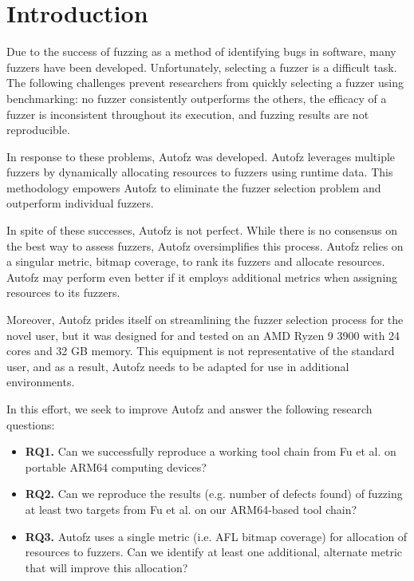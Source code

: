 \section{Introduction}

Due to the success of fuzzing as a method of identifying bugs in software, many fuzzers have been 
developed. Unfortunately, selecting a fuzzer is a difficult task. The following challenges prevent 
researchers from quickly selecting a fuzzer using benchmarking: no fuzzer consistently outperforms 
the others, the efficacy of a fuzzer is inconsistent throughout its execution, and fuzzing results 
are not reproducible.

In response to these problems, Autofz was developed. Autofz leverages multiple fuzzers by dynamically 
allocating resources to fuzzers using runtime data. This methodology empowers Autofz to eliminate the 
fuzzer selection problem and outperform individual fuzzers.

In spite of these successes, Autofz is not perfect. While there is no consensus on the best way to 
assess fuzzers, Autofz oversimplifies this process. Autofz relies on a singular metric, bitmap 
coverage, to rank its fuzzers and allocate resources. Autofz may perform even better if it employs 
additional metrics when assigning resources to its fuzzers.

Moreover, Autofz prides itself on streamlining the fuzzer selection process for the novel user, but 
it was designed for and tested on an AMD Ryzen 9 3900 with 24 cores and 32 GB memory. This equipment 
is not representative of the standard user, and as a result, Autofz needs to be adapted for use in 
additional environments. \cite{Fu}

In this effort, we seek to improve Autofz and answer the following research questions:
\begin{itemize}
    \item \textbf{RQ1.} Can we successfully reproduce a working tool chain from
    Fu et al. \cite{Fu} on portable ARM64 computing devices?
    \item \textbf{RQ2.} Can we reproduce the results (e.g. number of defects found)
     of fuzzing at least two targets from Fu et al. \cite{Fu} on our ARM64-based
      tool chain?
    \item \textbf{RQ3.} Autofz uses a single metric (i.e. AFL bitmap coverage) for
     allocation of resources to fuzzers. Can we identify at least one additional,
     alternate metric that will improve this allocation?
\end{itemize}
